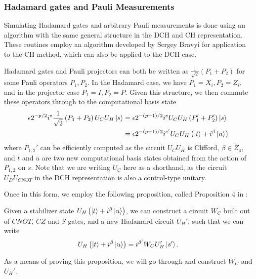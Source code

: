 \subsubsection*{Hadamard gates and Pauli Measurements}
Simulating Hadamard gates and arbitrary Pauli measurements is done using an algorithm with the same general structure in the DCH and CH representation. These routines employ an algorithm developed by Sergey Bravyi for application to the CH method,  which can also be applied to the DCH case.\par
Hadamard gates and Pauli projectors can both be written as $\frac{1}{\sqrt{2}}\left(P_{1}+P_{2}\right)$ for some Pauli operators $P_{1},P_{2}$. In the Hadamard case, we have $P_{1}=X_{i},P_{2}=Z_{i}$, and in the projector case $P_{1}=I,P_{2}=P$. Given this structure, we then commute these operators through to the computational basis state
\begin{align*}
\epsilon 2^{-p/2}i^{e}\frac{1}{\sqrt{2}}\left(P_{1}+P_{2}\right)U_{C}U_{H}\ket{s} &=
\epsilon 2^{-(p+1)/2}i^{e} U_{C}U_{H}\left(P_{1}'+P_{2}'\right)\ket{s} \\ 
&= \epsilon 2^{-(p+1)/2}i^{e'} U_{C}U_{H}\left(\ket{t}+i^{\beta}\ket{u}\right)
\end{align*}
where $P_{1,2}'$ can be efficiently computed as the circuit $U_{C}U_{H}$ is Clifford, $\beta\in\mathbb{}Z_{4}$, and $t$ and $u$ are two new computational basis states obtained from the action of $P_{1,2}$ on $s$. Note that we are writing $U_{C}$ here as a shorthand, as the circuit $U_{D}U_{CNOT}$ in the DCH representation is also a control-type unitary.\par
Once in this form, we employ the following proposition, called Proposition $4$ in \cite{Bravyi2018}:
\begin{prop}
\label{prop:pseudocz}
Given a stabilizer state $U_{H}\left(\ket{t}+i^{\beta}\ket{u}\right)$, we can construct a circuit $W_{C}$ built out of $CNOT$, $CZ$ and $S$ gates, and a new Hadamard circuit $U_{H}'$, such that we can write
\[U_{H}\left(\ket{t}+i^{\beta}\ket{u}\right) = i^{\beta'}W_{C}U_{H}'\ket{s'}.\]
\end{prop}
As a means of proving this proposition, we will go through and construct $W_{C}$ and $U_{H}'$.
